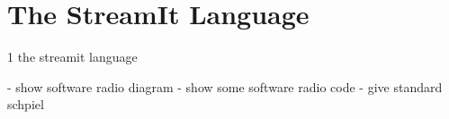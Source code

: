 \section{The StreamIt Language}
\label{sec:streamit}

1 the streamit language

  - show software radio diagram
  - show some software radio code
  - give standard schpiel


